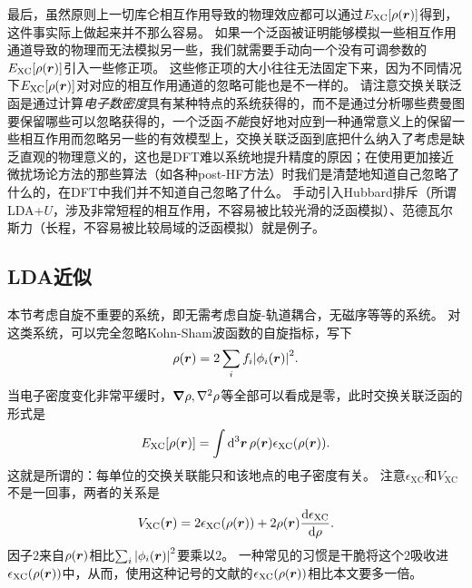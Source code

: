 最后，虽然原则上一切库仑相互作用导致的物理效应都可以通过$E_\text{XC}[\rho(\vb*{r})]$得到，这件事实际上做起来并不那么容易。
如果一个泛函被证明能够模拟一些相互作用通道导致的物理而无法模拟另一些，我们就需要手动向一个没有可调参数的$E_\text{XC}[\rho(\vb*{r})]$引入一些修正项。
这些修正项的大小往往无法固定下来，因为不同情况下$E_\text{XC}[\rho(\vb*{r})]$对对应的相互作用通道的忽略可能也是不一样的。
请注意交换关联泛函是通过计算\emph{电子数密度}具有某种特点的系统获得的，而不是通过分析哪些费曼图要保留哪些可以忽略获得的，一个泛函\emph{不能}良好地对应到一种通常意义上的保留一些相互作用而忽略另一些的有效模型上，交换关联泛函到底把什么纳入了考虑是缺乏直观的物理意义的，这也是DFT难以系统地提升精度的原因；在使用更加接近微扰场论方法的那些算法（如各种post-HF方法）时我们是清楚地知道自己忽略了什么的，在DFT中我们并不知道自己忽略了什么。
手动引入Hubbard排斥（所谓LDA+$U$，涉及非常短程的相互作用，不容易被比较光滑的泛函模拟）、范德瓦尔斯力（长程，不容易被比较局域的泛函模拟）就是例子。

\subsection{LDA近似}

本节考虑自旋不重要的系统，即无需考虑自旋-轨道耦合，无磁序等等的系统。
对这类系统，可以完全忽略Kohn-Sham波函数的自旋指标，写下
\begin{equation}
    \rho(\vb*{r}) = 2 \sum_{i} f_i \abs{\phi_i(\vb*{r})}^2.
\end{equation}
当电子密度变化非常平缓时，$\grad{\rho},\laplacian{\rho}$等全部可以看成是零，此时交换关联泛函的形式是
\begin{equation}
    E_\text{XC}[\rho(\vb*{r})] = \int \dd[3]{\vb*{r}} \rho(\vb*{r}) \epsilon_\text{XC}(\rho(\vb*{r})).
\end{equation}
这就是所谓的：每单位的交换关联能只和该地点的电子密度有关。
注意$\epsilon_\text{XC}$和$V_\text{XC}$不是一回事，两者的关系是
\begin{equation}
    V_\text{XC}(\vb*{r}) = 2 \epsilon_{\text{XC}}(\rho(\vb*{r})) + 2 \rho(\vb*{r}) \dv{\epsilon_\text{XC}}{\rho}.
    \label{eq:from-epsilon-xc-to-v-xc}
\end{equation}
因子$2$来自$\rho(\vb*{r})$相比$\sum_i \abs{\phi_i(\vb*{r})}^2$要乘以$2$。
一种常见的习惯是干脆将这个$2$吸收进$\epsilon_\text{XC}(\rho(\vb*{r}))$中，从而，使用这种记号的文献的$\epsilon_\text{XC}(\rho(\vb*{r}))$相比本文要多一倍。

